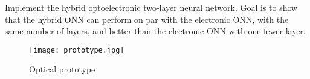Implement the hybrid optoelectronic two-layer neural network. Goal is to show that the hybrid ONN can perform on par with the electronic ONN, with the same number of layers, and better than the electronic ONN with one fewer layer.\\
\begin{figure}
\centering
\texttt{[image: prototype.jpg]}
\caption{Optical prototype}
\label{fig:prototype}
\end{figure}
